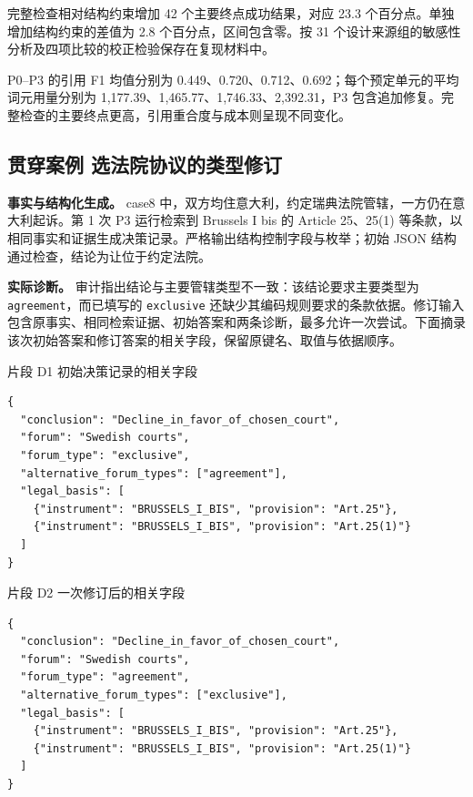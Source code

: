 \documentclass[pdflatex,iicol,sn-mathphys-num]{sn-jnl}
\begin{document}
完整检查相对结构约束增加 42 个主要终点成功结果，对应 23.3 个百分点。单独增加结构约束的差值为 2.8 个百分点，区间包含零。按 31 个设计来源组的敏感性分析及四项比较的校正检验保存在复现材料中。


P0–P3 的引用 F1 均值分别为 0.449、0.720、0.712、0.692；每个预定单元的平均词元用量分别为 1,177.39、1,465.77、1,746.33、2,392.31，P3 包含追加修复。完整检查的主要终点更高，引用重合度与成本则呈现不同变化。


\subsection{贯穿案例 选法院协议的类型修订}\label{app:D-3}

\textbf{事实与结构化生成。} case8 中，双方均住意大利，约定瑞典法院管辖，一方仍在意大利起诉。第 1 次 P3 运行检索到 Brussels I bis 的 Article 25、25(1) 等条款，以相同事实和证据生成决策记录。严格输出结构控制字段与枚举；初始 JSON 结构通过检查，结论为让位于约定法院。


\textbf{实际诊断。} 审计指出结论与主要管辖类型不一致：该结论要求主要类型为 \texttt{agreement}，而已填写的 \texttt{exclusive} 还缺少其编码规则要求的条款依据。修订输入包含原事实、相同检索证据、初始答案和两条诊断，最多允许一次尝试。下面摘录该次初始答案和修订答案的相关字段，保留原键名、取值与依据顺序。


\par\noindent\begin{minipage}{\columnwidth}
片段 D1 初始决策记录的相关字段\par
\begin{Verbatim}[fontsize=\footnotesize,breaklines=true,breakanywhere=true,breaksymbolleft={},frame=lines,framesep=3mm,rulecolor=\color{lightgray}]
{
  "conclusion": "Decline_in_favor_of_chosen_court",
  "forum": "Swedish courts",
  "forum_type": "exclusive",
  "alternative_forum_types": ["agreement"],
  "legal_basis": [
    {"instrument": "BRUSSELS_I_BIS", "provision": "Art.25"},
    {"instrument": "BRUSSELS_I_BIS", "provision": "Art.25(1)"}
  ]
}
\end{Verbatim}
\end{minipage}\par

\par\noindent\begin{minipage}{\columnwidth}
片段 D2 一次修订后的相关字段\par
\begin{Verbatim}[fontsize=\footnotesize,breaklines=true,breakanywhere=true,breaksymbolleft={},frame=lines,framesep=3mm,rulecolor=\color{lightgray}]
{
  "conclusion": "Decline_in_favor_of_chosen_court",
  "forum": "Swedish courts",
  "forum_type": "agreement",
  "alternative_forum_types": ["exclusive"],
  "legal_basis": [
    {"instrument": "BRUSSELS_I_BIS", "provision": "Art.25"},
    {"instrument": "BRUSSELS_I_BIS", "provision": "Art.25(1)"}
  ]
}
\end{Verbatim}
\end{minipage}\par
\end{document}
